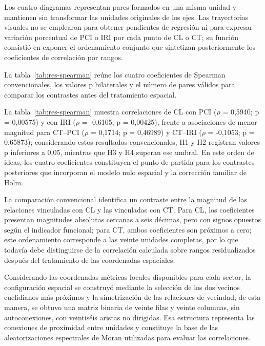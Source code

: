 
Los cuatro diagramas representan pares formados en una misma unidad y mantienen sin transformar las unidades originales de los ejes. Las trayectorias visuales no se emplearon para obtener pendientes de regresión ni para expresar variación porcentual de PCI o IRI por cada punto de CL o CT; su función consistió en exponer el ordenamiento conjunto que sintetizan posteriormente los coeficientes de correlación por rangos.

La tabla~\ref{tab:res-spearman} reúne los cuatro coeficientes de Spearman convencionales, los valores p bilaterales y el número de pares válidos para comparar los contrastes antes del tratamiento espacial.

\tablaResultadoSiete

La tabla~\ref{tab:res-spearman} muestra correlaciones de CL con PCI (\(\rho\) = 0,5940; p = 0,00575) y con IRI (\(\rho\) = -0,6105; p = 0,00425), frente a asociaciones de menor magnitud para CT–PCI (\(\rho\) = 0,1714; p = 0,46989) y CT–IRI (\(\rho\) = -0,1053; p = 0,65873); considerando estos resultados convencionales, H1 y H2 registran valores p inferiores a 0,05, mientras que H3 y H4 superan ese umbral. En este orden de ideas, los cuatro coeficientes constituyen el punto de partida para los contrastes posteriores que incorporan el modelo nulo espacial y la corrección familiar de Holm.


La comparación convencional identifica un contraste entre la magnitud de las relaciones vinculadas con CL y las vinculadas con CT. Para CL, los coeficientes presentan magnitudes absolutas cercanas a seis décimas, pero con signos opuestos según el indicador funcional; para CT, ambos coeficientes son próximos a cero; este ordenamiento corresponde a las veinte unidades completas, por lo que todavía debe distinguirse de la correlación calculada sobre rangos residualizados después del tratamiento de las coordenadas espaciales.


Considerando las coordenadas métricas locales disponibles para cada sector, la configuración espacial se construyó mediante la selección de los dos vecinos euclidianos más próximos y la simetrización de las relaciones de vecindad; de esta manera, se obtuvo una matriz binaria de veinte filas y veinte columnas, sin autoconexiones, con veintiséis aristas no dirigidas. Esa estructura representa las conexiones de proximidad entre unidades y constituye la base de las aleatorizaciones espectrales de Moran utilizadas para evaluar las correlaciones.

